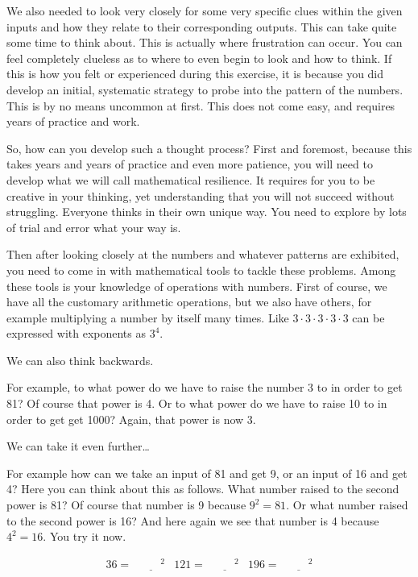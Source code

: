 \documentclass{article}
\begin{document}
We also needed to look very closely for some very specific clues
within the given inputs and how they relate to their corresponding
outputs. This can take quite some time to think about. This is
actually where frustration can occur. You can feel completely clueless
as to where to even begin to look and how to think. If this is how you
felt or experienced during this exercise, it is because you did
develop an initial, systematic strategy to probe into the pattern of
the numbers. This is by no means uncommon at first. This does not come
easy, and requires years of practice and work.

So, how can you develop such a thought process? First and foremost,
because this takes years and years of practice and even more patience,
you will need to develop what we will call mathematical resilience. It
requires for you to be creative in your thinking, yet understanding
that you will not succeed without struggling. Everyone thinks in their
own unique way. You need to explore by lots of trial and error what
your way is.

Then after looking closely at the numbers and whatever patterns are
exhibited, you need to come in with mathematical tools to tackle these
problems. Among these tools is your knowledge of operations with
numbers. First of course, we have all the customary arithmetic
operations, but we also have others, for example multiplying a number
by itself many times. Like \(3 \cdot 3 \cdot 3 \cdot 3 \cdot 3\) can be expressed with
exponents as \(3^4\).

We can also think backwards.

For example, to what power do we have to raise the number 3 to in order to get 81?
Of course that power is 4.  Or to what power do we have to raise 10 to
in order to get get 1000? Again, that power is now 3.

We can take it even further\dots

For example how can we take an input of 81 and get 9, or an input of
16 and get 4? Here you can think about this as follows. What number
raised to the second power is 81? Of course that number is 9 because \(9^2 = 81\). Or what number raised to the second power is 16? And here
again we see that number is 4 because \(4^2 = 16\). You try it now.

\begin{align*}
  36 =& \underline{\phantom{xxx}}^2 & 121 =& \underline{\phantom{xxx}}^2  & 196 =& \underline{\phantom{xxx}}^2
\end{align*}
\end{document}
